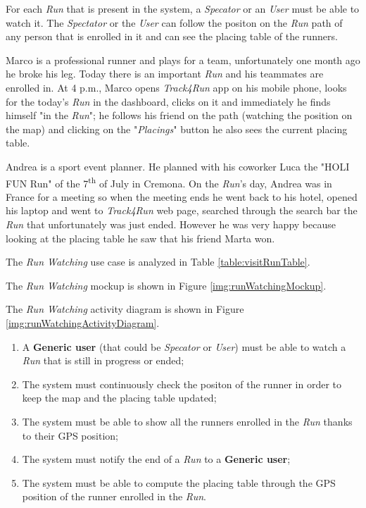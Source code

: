 For each \textit{Run} that is present in the system, a \textit{Specator} or an \textit{User} must be able to watch it.
The \textit{Spectator} or the \textit{User} can follow the positon on the \textit{Run} path of any person that is enrolled in it and can see the placing table of the runners.

Marco is a professional runner and plays for a team, unfortunately one month ago he broke his leg. Today there is an important \textit{Run} and his teammates are enrolled in. At 4 p.m., Marco opens \textit{Track4Run} app on his mobile phone, looks for the today's \textit{Run} in the dashboard, clicks on it and immediately he finds himself "in the \textit{Run}";
he follows his friend on the path (watching the position on the map) and clicking on the "\textit{Placings}" button he also sees the current placing table.

Andrea is a sport event planner. He planned with his coworker Luca the "HOLI FUN Run" of the 7\textsuperscript{th} of July in Cremona. On the \textit{Run}'s day, Andrea was in France for a meeting so when the meeting ends he went back to his hotel, opened his laptop and went to \textit{Track4Run} web page, searched through the search bar the \textit{Run} that unfortunately was just ended. However he was very happy because looking at the placing table he saw that his friend Marta won.

The \textit{Run Watching} use case is analyzed in Table \ref{table:visitRunTable}.

The \textit{Run Watching} mockup is shown in Figure \ref{img:runWatchingMockup}.

The \textit{Run Watching} activity diagram is shown in Figure \ref{img:runWatchingActivityDiagram}.

\begin{enumerate}
  \item A \textbf{Generic user} (that could be \textit{Specator} or \textit{User}) must be able to watch a \textit{Run} that is still in progress or ended;
  \item The system must continuously check the positon of the runner in order to keep the map and the placing table updated;
  \item The system must be able to show all the runners enrolled in the \textit{Run} thanks to their GPS position;
  \item The system must notify the end of a \textit{Run} to a \textbf{Generic user};
  \item The system must be able to compute the placing table through the GPS position of the runner enrolled in the \textit{Run}.
\end{enumerate}

